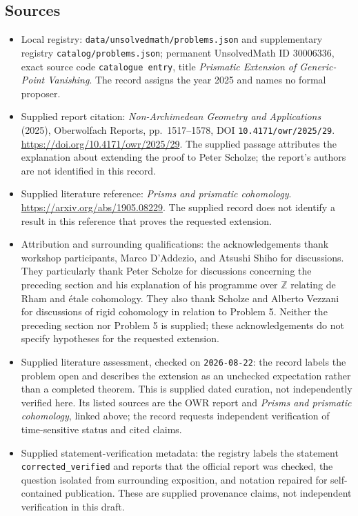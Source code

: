 \documentclass[11pt]{article}
\newcommand{\Z}{\mathbb{Z}}
\begin{document}
\subsection{Sources}
\begin{itemize}
\item Local registry: \texttt{data/unsolvedmath/problems.json} and supplementary registry \texttt{catalog/problems.json}; permanent UnsolvedMath ID \(30006336\), exact source code \texttt{catalogue entry}, title \emph{Prismatic Extension of Generic-Point Vanishing}. The record assigns the year 2025 and names no formal proposer.
\item Supplied report citation: \emph{Non-Archimedean Geometry and Applications} (2025), Oberwolfach Reports, pp.\ 1517--1578, DOI \texttt{10.4171/owr/2025/29}. \url{https://doi.org/10.4171/owr/2025/29}. The supplied passage attributes the explanation about extending the proof to Peter Scholze; the report's authors are not identified in this record.
\item Supplied literature reference: \emph{Prisms and prismatic cohomology}. \url{https://arxiv.org/abs/1905.08229}. The supplied record does not identify a result in this reference that proves the requested extension.
\item Attribution and surrounding qualifications: the acknowledgements thank workshop participants, Marco D'Addezio, and Atsushi Shiho for discussions. They particularly thank Peter Scholze for discussions concerning the preceding section and his explanation of his programme over \(\Z\) relating de Rham and étale cohomology. They also thank Scholze and Alberto Vezzani for discussions of rigid cohomology in relation to Problem 5. Neither the preceding section nor Problem 5 is supplied; these acknowledgements do not specify hypotheses for the requested extension.
\item Supplied literature assessment, checked on \texttt{2026-08-22}: the record labels the problem open and describes the extension as an unchecked expectation rather than a completed theorem. This is supplied dated curation, not independently verified here. Its listed sources are the OWR report and \emph{Prisms and prismatic cohomology}, linked above; the record requests independent verification of time-sensitive status and cited claims.
\item Supplied statement-verification metadata: the registry labels the statement \texttt{corrected\_verified} and reports that the official report was checked, the question isolated from surrounding exposition, and notation repaired for self-contained publication. These are supplied provenance claims, not independent verification in this draft.
\end{itemize}
\end{document}
